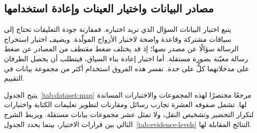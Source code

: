 \subsection{مصادر البيانات واختيار العينات وإعادة استخدامها}
\label{sec:datasets}


يتبع اختيار البيانات السؤال الذي نريد اختباره. فمقارنة جودة التعليقات تحتاج إلى سياقات مشتركة وقاعدة واضحة لاختيار الأزواج المولّدة. ويضيف اختبار استخراج الرسالة سؤالًا عن مصدر نصها؛ إذ قد يختلف ضغط مقتطف من المصادر عن ضغط رسالة معيّنة بصورة مستقلة. أما اختبار إعادة بناء السياق، فيتطلب أن يحصل الطرفان على مدخلاتهما كلٌّ على حدة. تفسر هذه الفروق استخدام أكثر من مجموعة بيانات في التقييم.

يتيح الجدول~\ref{tab:dataset-map} مرجعًا مختصرًا لهذه المجموعات والاختبارات المساندة لها. تشمل صفوفه العشرة تجارب رسائل ومقارنات لتطوير تعليمات الكتابة واختبارات لتكرار التحضير وتشخيص النقل، ولا تمثل عشر مجموعات بيانات مستقلة. ويربط الشرح التالي بين قرارات الاختيار، بينما يحدد الجدول~\ref{tab:evidence-levels} النتائج المقابلة لها.


